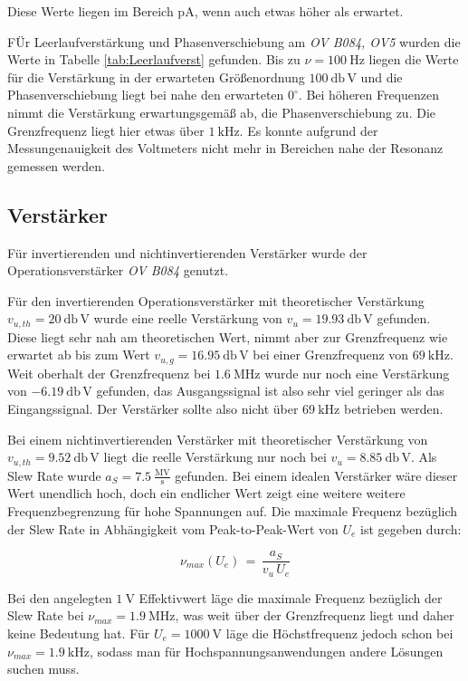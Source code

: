 \documentclass[10pt,a4paper]{scrartcl}
\begin{document}
Diese Werte liegen im Bereich $\mathrm{pA}$,
wenn auch etwas höher als erwartet.

FÜr Leerlaufverstärkung und Phasenverschiebung am \emph{OV B084, OV5}
wurden die Werte in Tabelle \ref{tab:Leerlaufverst} gefunden.
Bis zu $\nu=100~\mathrm{Hz}$ liegen die Werte für die Verstärkung
in der erwarteten Größenordnung $100~\mathrm{db\,V}$
und die Phasenverschiebung liegt bei nahe den erwarteten $0^\circ$.
Bei höheren Frequenzen nimmt die Verstärkung erwartungsgemäß ab,
die Phasenverschiebung zu.
Die Grenzfrequenz liegt hier etwas über $1~\mathrm{kHz}$.
Es konnte aufgrund der Messungenauigkeit des Voltmeters nicht mehr in Bereichen
nahe der Resonanz gemessen werden.

\subsection {Verstärker}

Für invertierenden und nichtinvertierenden Verstärker wurde der
Operationsverstärker \emph{OV B084} genutzt.

Für den invertierenden Operationsverstärker mit theoretischer Verstärkung
$v_{u,th}=20~\mathrm{db\,V}$ wurde eine reelle Verstärkung von
$\boxed{v_u=19.93~\mathrm{db\,V}}$ gefunden.
Diese liegt sehr nah am theoretischen Wert,
nimmt aber zur Grenzfrequenz wie erwartet ab bis zum Wert
$\boxed{v_{u,g}=16.95~\mathrm{db\,V}}$ bei einer Grenzfrequenz von
$\boxed{69~\mathrm{kHz}}$.
Weit oberhalt der Grenzfrequenz bei $1.6~\mathrm{MHz}$ wurde nur noch eine
Verstärkung von $-6.19~\mathrm{db\,V}$ gefunden,
das Ausgangssignal ist also sehr viel geringer als das Eingangssignal.
Der Verstärker sollte also nicht über $69~\mathrm{kHz}$ betrieben werden.

Bei einem nichtinvertierenden Verstärker mit theoretischer Verstärkung von
$v_{u,th}=9.52~\mathrm{db\,V}$ liegt die reelle Verstärkung nur noch bei
$\boxed{v_u=8.85~\mathrm{db\,V}}$.
Als Slew Rate wurde $\boxed{a_S=7.5~\mathrm{\frac{MV}{s}}}$ gefunden.
Bei einem idealen Verstärker wäre dieser Wert unendlich hoch,
doch ein endlicher Wert zeigt eine weitere weitere Frequenzbegrenzung für
hohe Spannungen auf.
Die maximale Frequenz bezüglich der Slew Rate in Abhängigkeit vom
Peak-to-Peak-Wert von $U_e$ ist gegeben durch:

\begin{equation*}
    \nu_{max}(U_e)\,=\,\frac{a_S}{v_u\,U_e}
\end{equation*}

Bei den angelegten $1~\mathrm V$ Effektivwert läge die maximale Frequenz
bezüglich der Slew Rate bei $\nu_{max}=1.9~\mathrm{MHz}$,
was weit über der Grenzfrequenz liegt und daher keine Bedeutung hat.
Für $U_e=1000~\mathrm V$ läge die Höchstfrequenz jedoch schon bei
$\nu_{max}=1.9~\mathrm{kHz}$,
sodass man für Hochspannungsanwendungen andere Lösungen suchen muss.
\end{document}
